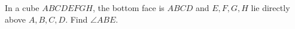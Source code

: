 In a cube $ABCDEFGH$, the bottom face is $ABCD$ and $E,F,G,H$ lie directly above $A,B,C,D$. Find $\angle ABE$.
